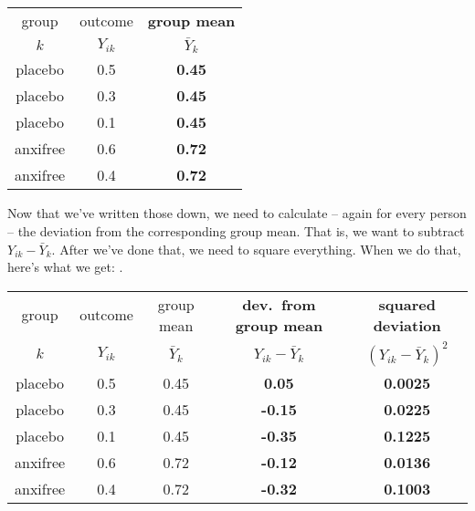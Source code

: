 \small
\vspace*{6pt}
\begin{tabular}{c|c|c} %
 group & outcome  & {\bf group mean} \\%
  $k$ &  $Y_{ik}$  & $\bar{Y}_k$ \\ \hline %
placebo  & 0.5  & {\bf 0.45} \\%
placebo  & 0.3 &  {\bf 0.45} \\%
placebo  &  0.1 &  {\bf 0.45} \\%
anxifree  & 0.6  & {\bf 0.72} \\%
anxifree  &  0.4 &  {\bf 0.72}\\%
\end{tabular}
\vspace*{6pt}
\normalsize

\noindent
Now that we've written those down, we need to calculate -- again for every person -- the deviation from the corresponding group mean. That is, we want to subtract $Y_{ik} - \bar{Y}_k$. After we've done that, we need to square everything. When we do that, here's what we get:
. 

\small
\vspace*{6pt}
\begin{tabular}{c|c|c|c|c}
 group & outcome  & group mean & {\bf dev.\ from group mean} & {\bf squared deviation}\\  
  $k$ &  $Y_{ik}$  & $\bar{Y}_k$ & $Y_{ik} - \bar{Y}_{k}$ &  $(Y_{ik} - \bar{Y}_{k})^2$\\  \hline
placebo  & 0.5  & 0.45  & {\bf 0.05}  & {\bf 0.0025} \\
placebo  & 0.3 &  0.45 &  {\bf -0.15} & {\bf 0.0225}\\
placebo  &  0.1 &  0.45 &{\bf -0.35}  & {\bf 0.1225} \\
anxifree  & 0.6  & 0.72  & {\bf -0.12}  & {\bf 0.0136} \\
anxifree  &  0.4 &  0.72 & {\bf -0.32} & {\bf 0.1003} \\ 
\end{tabular}
\vspace*{6pt}
\normalsize

